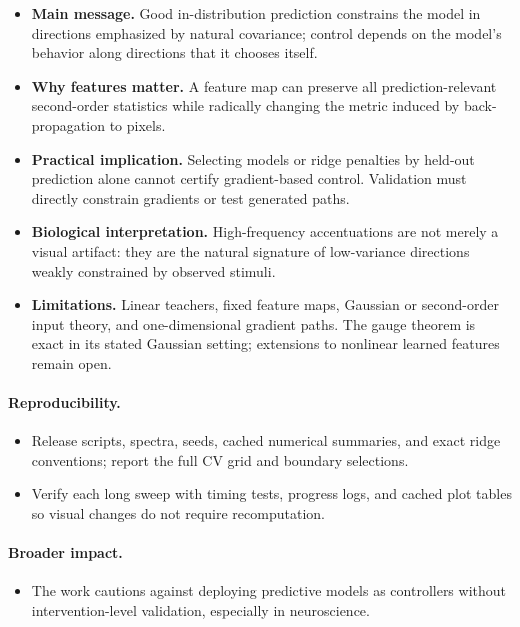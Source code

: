 \documentclass{article}
\begin{document}
\begin{itemize}[leftmargin=1.3em]
  \item \textbf{Main message.} Good in-distribution prediction constrains the
        model in directions emphasized by natural covariance; control depends
        on the model's behavior along directions that it chooses itself.
  \item \textbf{Why features matter.} A feature map can preserve all
        prediction-relevant second-order statistics while radically changing
        the metric induced by back-propagation to pixels.
  \item \textbf{Practical implication.} Selecting models or ridge penalties
        by held-out prediction alone cannot certify gradient-based control.
        Validation must directly constrain gradients or test generated paths.
  \item \textbf{Biological interpretation.} High-frequency accentuations are
        not merely a visual artifact: they are the natural signature of
        low-variance directions weakly constrained by observed stimuli.
  \item \textbf{Limitations.} Linear teachers, fixed feature maps, Gaussian or
        second-order input theory, and one-dimensional gradient paths. The
        gauge theorem is exact in its stated Gaussian setting; extensions to
        nonlinear learned features remain open.
\end{itemize}

\paragraph{Reproducibility.}
\begin{itemize}[leftmargin=1.3em,itemsep=1pt,topsep=2pt]
  \item Release scripts, spectra, seeds, cached numerical summaries, and exact
        ridge conventions; report the full CV grid and boundary selections.
  \item Verify each long sweep with timing tests, progress logs, and cached
        plot tables so visual changes do not require recomputation.
\end{itemize}

\paragraph{Broader impact.}
\begin{itemize}[leftmargin=1.3em,itemsep=1pt,topsep=2pt]
  \item The work cautions against deploying predictive models as controllers
        without intervention-level validation, especially in neuroscience.
\end{itemize}
\end{document}
